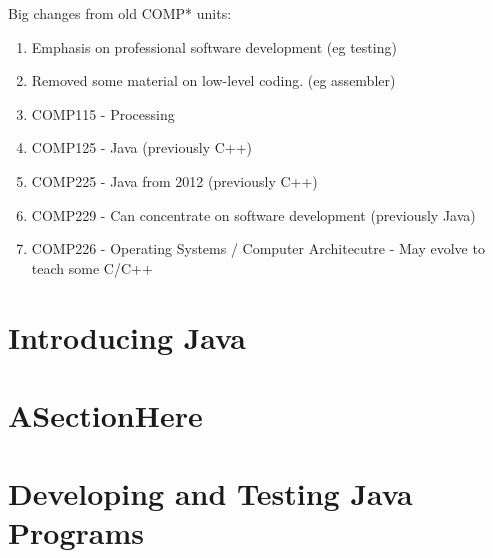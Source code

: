 Big changes from old COMP* units:
\begin{enumerate}
  \item Emphasis on professional software development (eg testing)
  \item Removed some material on low-level coding. (eg assembler)
  \item COMP115 - Processing
  \item COMP125 - Java (previously C++)
  \item COMP225 - Java from 2012 (previously C++)
  \item COMP229 - Can concentrate on software development (previously Java)
  \item COMP226 - Operating Systems / Computer Architecutre - May evolve to
        teach some C/C++
\end{enumerate}

\chapter{Introducing Java}
\label{chap:IntroducingJava}

\chapter{ASectionHere}
\label{sec:ASectionHere}
\lipsum[1]

\chapter{Developing and Testing Java Programs}
\label{chap:DevelopingAndTestingJavaPrograms}
